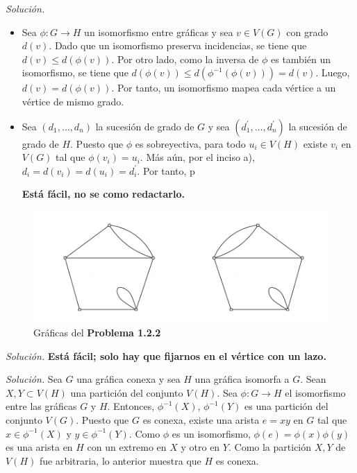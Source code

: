 \documentclass[12pt]{article}
\newenvironment{problem}[2][Problema]{\begin{trivlist}
\item[\hskip \labelsep {\bfseries #1}\hskip \labelsep {\bfseries #2}]}{\end{trivlist}}
\begin{document}
\begin{problem}{1.2.1}
\end{problem}
\textit{Solución.} \begin{itemize}
    \item[a)] Sea $\phi: G \rightarrow H$ un isomorfismo entre gráficas y sea $v \in V(G)$ con grado $d(v).$ Dado que un isomorfismo preserva incidencias, se tiene que $d(v) \leq d(\phi(v)).$ Por otro lado, como la inversa de $\phi$ es también un isomorfismo, se tiene que $d(\phi(v))  \leq d(\phi^{-1}(\phi(v))) =  d(v).$ Luego, $d(v) = d(\phi(v)).$ Por tanto, un isomorfismo mapea cada vértice a un vértice de mismo grado.
    \item[b)] Sea $(d_1, \ldots, d_n)$ la sucesión de grado de $G$ y sea $(d_1^\prime, \ldots, d_n^\prime)$ la sucesión de grado de $H.$ Puesto que $\phi$ es sobreyectiva, para todo $u_i \in V(H)$ existe $v_i$ en $V(G)$ tal que $\phi(v_i) = u_i.$ Más aún, por el inciso a), $d_i = d(v_i) = d(u_i) = d_i^\prime.$ Por tanto, p

    \textbf{Está fácil, no se como redactarlo.}
    
\end{itemize}

\begin{figure}
    \centering
    \includegraphics[scale=0.65]{pics/p1.2.2.png}
    \caption{Gráficas del \textbf{Problema 1.2.2}}
    \label{fig:p1.2.2}
\end{figure}

\begin{problem}{1.2.2}

\end{problem}
\textit{Solución.} \textbf{Está fácil; solo hay que fijarnos en el vértice con un lazo.}

\begin{problem}{1.2.3}

\end{problem}
\textit{Solución.} Sea $G$ una gráfica conexa y sea $H$ una gráfica isomorfa a $G.$ Sean $X, Y \subset V(H)$ una partición del conjunto $V(H).$ Sea $\phi: G \rightarrow H$ el isomorfismo entre las gráficas $G$ y $H.$ Entonces, $\phi^{-1}(X)$, $\phi^{-1}(Y)$ es una partición del conjunto $V(G)$. Puesto que $G$ es conexa, existe una arista $e = xy$ en $G$ tal que $x \in \phi^{-1}(X)$ y $y \in \phi^{-1}(Y).$ Como $\phi$ es un isomorfismo, $\phi(e) = \phi(x) \phi(y)$ es una arista en $H$ con un extremo en $X$ y otro en $Y.$ Como la partición $X,Y$ de $V(H)$ fue arbitraria, lo anterior muestra que $H$ es conexa.
\end{document}
